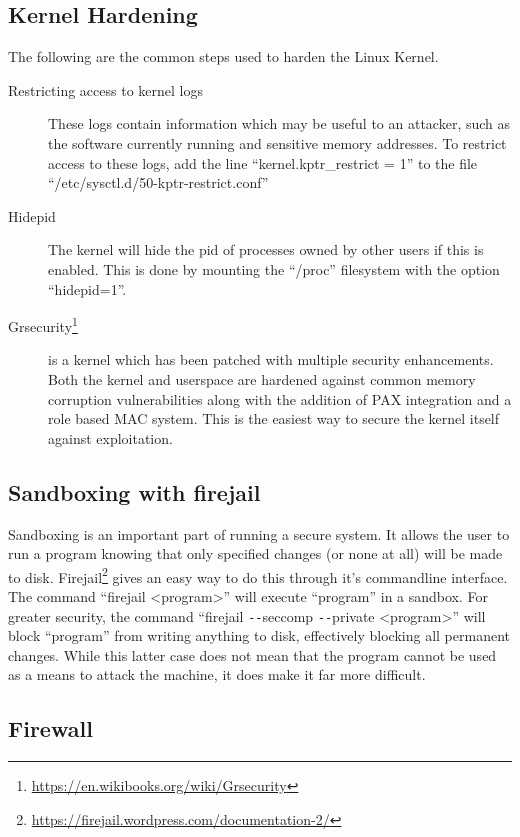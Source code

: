 \documentclass[a4paper,11pt]{report}
\begin{document}
			\subsection{Kernel Hardening}
				The following are the common steps used to harden the Linux Kernel. 
				\begin{description}
					\item[Restricting access to kernel logs]
						These logs contain information which may be useful to an attacker, such as the software currently running and sensitive memory addresses. 
						To restrict access to these logs, add the line ``kernel.kptr\_restrict = 1'' to the file ``/etc/sysctl.d/50-kptr-restrict.conf''
					\item[Hidepid] 
						The kernel will hide the pid of processes owned by other users if this is enabled. This is done by mounting the ``/proc'' filesystem with the option ``hidepid=1''. 
					\item[Grsecurity\footnote{\url{https://en.wikibooks.org/wiki/Grsecurity}}]
						is a kernel which has been patched with multiple security enhancements. 
						Both the kernel and userspace are hardened against common memory corruption vulnerabilities along with the addition of PAX integration and a role based MAC system. This is the easiest way to secure the kernel itself against exploitation. 
				\end{description}
				\subsection{Sandboxing with firejail}
					Sandboxing is an important part of running a secure system. 
					It allows the user to run a program knowing that only specified changes (or none at all) will be made to disk. 
					Firejail\footnote{\url{https://firejail.wordpress.com/documentation-2/}} gives an easy way to do this through it's commandline interface. 
					The command ``firejail <program>'' will execute ``program'' in a sandbox. 
					For greater security, the command ``firejail \verb+--+seccomp \verb+--+private <program>'' will block ``program'' from writing anything to disk, effectively blocking all permanent changes. 
					While this latter case does not mean that the program cannot be used as a means to attack the machine, it does make it far more difficult. 
				\subsection{Firewall} %
\end{document}
